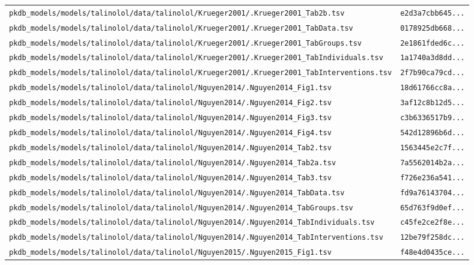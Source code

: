 \documentclass{article}
\begin{document}
\begin{longtable}{ll}
\texttt{pkdb\_models/models/talinolol/data/talinolol/Krueger2001/.Krueger2001\_Tab2b.tsv} & \texttt{e2d3a7cbb645...} \\
\texttt{pkdb\_models/models/talinolol/data/talinolol/Krueger2001/.Krueger2001\_TabData.tsv} & \texttt{0178925db668...} \\
\texttt{pkdb\_models/models/talinolol/data/talinolol/Krueger2001/.Krueger2001\_TabGroups.tsv} & \texttt{2e1861fded6c...} \\
\texttt{pkdb\_models/models/talinolol/data/talinolol/Krueger2001/.Krueger2001\_TabIndividuals.tsv} & \texttt{1a1740a3d8dd...} \\
\texttt{pkdb\_models/models/talinolol/data/talinolol/Krueger2001/.Krueger2001\_TabInterventions.tsv} & \texttt{2f7b90ca79cd...} \\
\texttt{pkdb\_models/models/talinolol/data/talinolol/Nguyen2014/.Nguyen2014\_Fig1.tsv} & \texttt{18d61766cc8a...} \\
\texttt{pkdb\_models/models/talinolol/data/talinolol/Nguyen2014/.Nguyen2014\_Fig2.tsv} & \texttt{3af12c8b12d5...} \\
\texttt{pkdb\_models/models/talinolol/data/talinolol/Nguyen2014/.Nguyen2014\_Fig3.tsv} & \texttt{c3b6336517b9...} \\
\texttt{pkdb\_models/models/talinolol/data/talinolol/Nguyen2014/.Nguyen2014\_Fig4.tsv} & \texttt{542d12896b6d...} \\
\texttt{pkdb\_models/models/talinolol/data/talinolol/Nguyen2014/.Nguyen2014\_Tab2.tsv} & \texttt{1563445e2c7f...} \\
\texttt{pkdb\_models/models/talinolol/data/talinolol/Nguyen2014/.Nguyen2014\_Tab2a.tsv} & \texttt{7a5562014b2a...} \\
\texttt{pkdb\_models/models/talinolol/data/talinolol/Nguyen2014/.Nguyen2014\_Tab3.tsv} & \texttt{f726e236a541...} \\
\texttt{pkdb\_models/models/talinolol/data/talinolol/Nguyen2014/.Nguyen2014\_TabData.tsv} & \texttt{fd9a76143704...} \\
\texttt{pkdb\_models/models/talinolol/data/talinolol/Nguyen2014/.Nguyen2014\_TabGroups.tsv} & \texttt{65d763f9d0ef...} \\
\texttt{pkdb\_models/models/talinolol/data/talinolol/Nguyen2014/.Nguyen2014\_TabIndividuals.tsv} & \texttt{c45fe2ce2f8e...} \\
\texttt{pkdb\_models/models/talinolol/data/talinolol/Nguyen2014/.Nguyen2014\_TabInterventions.tsv} & \texttt{12be79f258dc...} \\
\texttt{pkdb\_models/models/talinolol/data/talinolol/Nguyen2015/.Nguyen2015\_Fig1.tsv} & \texttt{f48e4d0435ce...} \\

\end{longtable}
\end{document}
